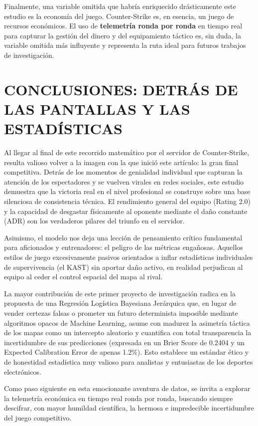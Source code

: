 \documentclass[twocolumn,10pt]{article}
\begin{document}
Finalmente, una variable omitida que habría enriquecido drásticamente este estudio es la economía del juego. Counter-Strike es, en esencia, un juego de recursos económicos. El uso de \textbf{telemetría ronda por ronda} en tiempo real para capturar la gestión del dinero y del equipamiento táctico es, sin duda, la variable omitida más influyente y representa la ruta ideal para futuros trabajos de investigación.

\section{CONCLUSIONES: DETRÁS DE LAS PANTALLAS Y LAS ESTADÍSTICAS}

Al llegar al final de este recorrido matemático por el servidor de Counter-Strike, resulta valioso volver a la imagen con la que inició este artículo: la gran final competitiva. Detrás de los momentos de genialidad individual que capturan la atención de los espectadores y se vuelven virales en redes sociales, este estudio demuestra que la victoria real en el nivel profesional se construye sobre una base silenciosa de consistencia técnica. El rendimiento general del equipo (Rating 2.0) y la capacidad de desgastar físicamente al oponente mediante el daño constante (ADR) son los verdaderos pilares del triunfo en el servidor.

Asimismo, el modelo nos deja una lección de pensamiento crítico fundamental para aficionados y entrenadores: el peligro de las métricas engañosas. Aquellos estilos de juego excesivamente pasivos orientados a inflar estadísticas individuales de supervivencia (el KAST) sin aportar daño activo, en realidad perjudican al equipo al ceder el control espacial del mapa al rival. 

La mayor contribución de este primer proyecto de investigación radica en la propuesta de una Regresión Logística Bayesiana Jerárquica que, en lugar de vender certezas falsas o prometer un futuro determinista imposible mediante algoritmos opacos de Machine Learning, asume con madurez la asimetría táctica de los mapas como un intercepto aleatorio y cuantifica con total transparencia la incertidumbre de sus predicciones (expresada en un Brier Score de 0.2404 y un Expected Calibration Error de apenas 1.2\%). Esto establece un estándar ético y de honestidad estadística muy valioso para analistas y entusiastas de los deportes electrónicos. 

Como paso siguiente en esta emocionante aventura de datos, se invita a explorar la telemetría económica en tiempo real ronda por ronda, buscando siempre descifrar, con mayor humildad científica, la hermosa e impredecible incertidumbre del juego competitivo.



\end{document}
